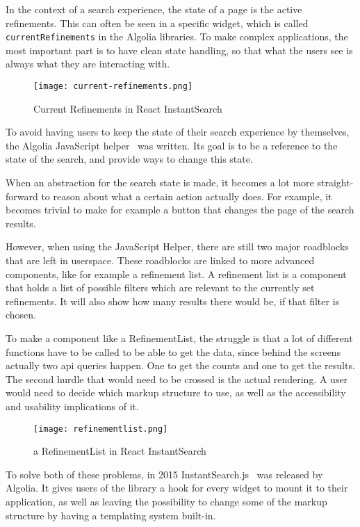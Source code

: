 In the context of a search experience, the state of a page is the active refinements. This can often be seen in a specific widget, which is called {\tt currentRefinements} in the Algolia libraries. To make complex applications, the most important part is to have clean state handling, so that what the users see is always what they are interacting with.

\begin{figure}[H]
  \centering
  \texttt{[image: current-refinements.png]}
  \caption{Current Refinements in React InstantSearch\cite{ris-storybooks}}
  \label{figure:current-refinements}
\end{figure}

To avoid having users to keep the state of their search experience by themselves, the Algolia JavaScript helper~\cite{algolia-js-helper} was written. Its goal is to be a reference to the state of the search, and provide ways to change this state.

When an abstraction for the search state is made, it becomes a lot more straight-forward to reason about what a certain action actually does. For example, it becomes trivial to make for example a button that changes the page of the search results.

However, when using the JavaScript Helper, there are still two major roadblocks that are left in \gls{userspace}. These roadblocks are linked to more advanced components, like for example a refinement list. A refinement list is a component that holds a list of possible filters which are relevant to the currently set refinements. It will also show how many results there would be, if that filter is chosen.

To make a component like a RefinementList, the struggle is that a lot of different functions have to be called to be able to get the data, since behind the screens actually two \acrshort{api} queries happen. One to get the counts and one to get the results. The second hurdle that would need to be crossed is the actual rendering. A user would need to decide which markup structure to use, as well as the accessibility and usability implications of it.

\begin{figure}[H]
  \centering
  \texttt{[image: refinementlist.png]}
  \caption{a RefinementList in React InstantSearch\cite{ris-storybooks}}
  \label{figure:refinementlist-ris}
\end{figure}

To solve both of these problems, in 2015 InstantSearch.js~\cite{instantsearch-js} was released by Algolia. It gives users of the \gls{library} a hook for every widget to mount it to their application, as well as leaving the possibility to change some of the markup structure by having a templating system built-in.

